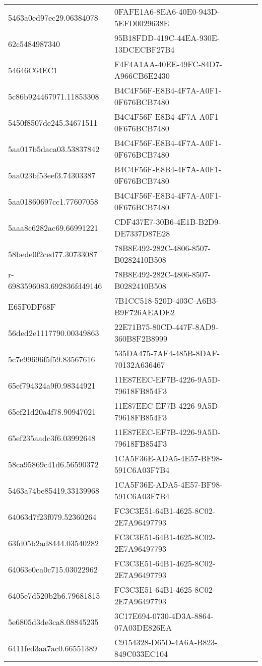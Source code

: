 \begin{tabular}{ll}
5463a0ed97ec29.06384078 & 0FAFE1A6-8EA6-40E0-943D-5EFD0029638E \\
62c5484987340 & 95B18FDD-419C-44EA-930E-13DCECBF27B4 \\
54646C64EC1 & F4F4A1AA-40EE-49FC-84D7-A966CB6E2430 \\
5c86b924467971.11853308 & B4C4F56F-E8B4-4F7A-A0F1-0F676BCB7480 \\
5450f8507de245.34671511 & B4C4F56F-E8B4-4F7A-A0F1-0F676BCB7480 \\
5aa017b5daca03.53837842 & B4C4F56F-E8B4-4F7A-A0F1-0F676BCB7480 \\
5aa023bf53eef3.74303387 & B4C4F56F-E8B4-4F7A-A0F1-0F676BCB7480 \\
5aa01860697cc1.77607058 & B4C4F56F-E8B4-4F7A-A0F1-0F676BCB7480 \\
5aaa8c6282ac69.66991221 & CDF437E7-30B6-4E1B-B2D9-DE7337D87E28 \\
58bede0f2ced77.30733087 & 78B8E492-282C-4806-8507-B0282410B508 \\
r-6983596083.692836fd49146 & 78B8E492-282C-4806-8507-B0282410B508 \\
E65F0DF68F & 7B1CC518-520D-403C-A6B3-B9F726AEADE2 \\
56ded2e1117790.00349863 & 22E71B75-80CD-447F-8AD9-360B8F2B8999 \\
5c7e99696f5f59.83567616 & 535DA475-7AF4-485B-8DAF-70132A636467 \\
65ef794324a9f0.98344921 & 11E87EEC-EF7B-4226-9A5D-79618FB854F3 \\
65ef21d20a4f78.90947021 & 11E87EEC-EF7B-4226-9A5D-79618FB854F3 \\
65ef235aadc3f6.03992648 & 11E87EEC-EF7B-4226-9A5D-79618FB854F3 \\
58ca95869c41d6.56590372 & 1CA5F36E-ADA5-4E57-BF98-591C6A03F7B4 \\
5463a74be85419.33139968 & 1CA5F36E-ADA5-4E57-BF98-591C6A03F7B4 \\
64063d7f23f079.52360264 & FC3C3E51-64B1-4625-8C02-2E7A96497793 \\
63fd05b2ad8444.03540282 & FC3C3E51-64B1-4625-8C02-2E7A96497793 \\
64063e0ca0c715.03022962 & FC3C3E51-64B1-4625-8C02-2E7A96497793 \\
6405e7d520b2b6.79681815 & FC3C3E51-64B1-4625-8C02-2E7A96497793 \\
5e6805d3de3ca8.08845235 & 3C17E694-0730-4D3A-8864-07A03DE826EA \\
6411fed3aa7ac0.66551389 & C9154328-D65D-4A6A-B823-849C033EC104 \\

\end{tabular}
